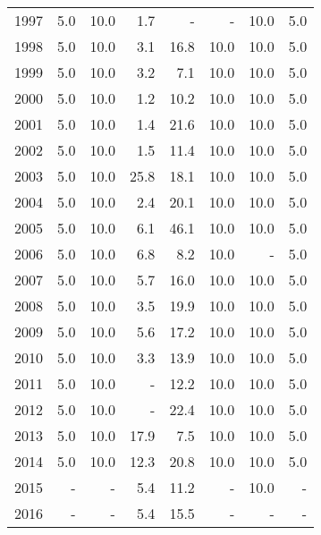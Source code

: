 \begin{longtable}{lrrrrrrr}
  1997 & 5.0 & 10.0 & 1.7 & - & - & 10.0 & 5.0 \\ 
  1998 & 5.0 & 10.0 & 3.1 & 16.8 & 10.0 & 10.0 & 5.0 \\ 
  1999 & 5.0 & 10.0 & 3.2 & 7.1 & 10.0 & 10.0 & 5.0 \\ 
  2000 & 5.0 & 10.0 & 1.2 & 10.2 & 10.0 & 10.0 & 5.0 \\ 
  2001 & 5.0 & 10.0 & 1.4 & 21.6 & 10.0 & 10.0 & 5.0 \\ 
  2002 & 5.0 & 10.0 & 1.5 & 11.4 & 10.0 & 10.0 & 5.0 \\ 
  2003 & 5.0 & 10.0 & 25.8 & 18.1 & 10.0 & 10.0 & 5.0 \\ 
  2004 & 5.0 & 10.0 & 2.4 & 20.1 & 10.0 & 10.0 & 5.0 \\ 
  2005 & 5.0 & 10.0 & 6.1 & 46.1 & 10.0 & 10.0 & 5.0 \\ 
  2006 & 5.0 & 10.0 & 6.8 & 8.2 & 10.0 & - & 5.0 \\ 
  2007 & 5.0 & 10.0 & 5.7 & 16.0 & 10.0 & 10.0 & 5.0 \\ 
  2008 & 5.0 & 10.0 & 3.5 & 19.9 & 10.0 & 10.0 & 5.0 \\ 
  2009 & 5.0 & 10.0 & 5.6 & 17.2 & 10.0 & 10.0 & 5.0 \\ 
  2010 & 5.0 & 10.0 & 3.3 & 13.9 & 10.0 & 10.0 & 5.0 \\ 
  2011 & 5.0 & 10.0 & - & 12.2 & 10.0 & 10.0 & 5.0 \\ 
  2012 & 5.0 & 10.0 & - & 22.4 & 10.0 & 10.0 & 5.0 \\ 
  2013 & 5.0 & 10.0 & 17.9 & 7.5 & 10.0 & 10.0 & 5.0 \\ 
  2014 & 5.0 & 10.0 & 12.3 & 20.8 & 10.0 & 10.0 & 5.0 \\ 
  2015 & - & - & 5.4 & 11.2 & - & 10.0 & - \\ 
  2016 & - & - & 5.4 & 15.5 & - & - & - \\ 
   \hline
\hline
\end{longtable}
\endgroup
